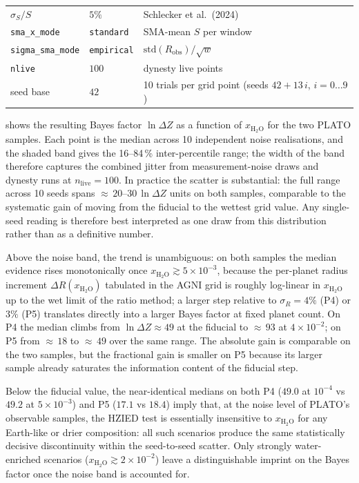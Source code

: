 \begin{table}[H]
\begin{tabular}{lll}
        $\sigma_S / S$             & $5\%$                  & Schlecker et al.\ (2024) \\
        \texttt{sma\_x\_mode}      & \texttt{standard}      & SMA-mean $S$ per window \\
        \texttt{sigma\_sma\_mode}  & \texttt{empirical}     & $\mathrm{std}(R_\mathrm{obs})/\sqrt{w}$ \\
        \texttt{nlive}             & $100$                  & dynesty live points \\
        seed base                  & $42$                   & 10 trials per grid point (seeds $42 + 13\,i$, $i=0\ldots9$) \\
        \bottomrule
    \end{tabular}
\end{table}

 shows the resulting Bayes factor $\ln\Delta Z$
as a function of $x_{\mathrm{H_2O}}$ for the two PLATO samples.  Each point
is the median across 10 independent noise realisations, and the shaded band
gives the 16--84\,\% inter-percentile range; the width of the band therefore
captures the combined jitter from measurement-noise draws and dynesty runs
at $n_\mathrm{live}=100$.  In practice the scatter is substantial: the full
range across 10 seeds spans ${\approx}\,20\text{--}30\,\ln\Delta Z$ units
on both samples, comparable to the systematic gain of moving from the
fiducial to the wettest grid value.  Any single-seed reading is therefore
best interpreted as one draw from this distribution rather than as a
definitive number.

Above the noise band, the trend is unambiguous: on both samples the median
evidence rises monotonically once $x_{\mathrm{H_2O}} \gtrsim 5\times10^{-3}$,
because the per-planet radius increment $\Delta R(x_{\mathrm{H_2O}})$
tabulated in the AGNI grid is roughly log-linear in $x_{\mathrm{H_2O}}$
up to the wet limit of the ratio method; a larger step relative to
$\sigma_R = 4\%$ (P4) or $3\%$ (P5) translates directly into a larger
Bayes factor at fixed planet count.  On P4 the median climbs from
$\ln\Delta Z \approx 49$ at the fiducial to ${\approx}\,93$ at
$4\times10^{-2}$; on P5 from ${\approx}\,18$ to ${\approx}\,49$ over the
same range.  The absolute gain is comparable on the two samples, but the
fractional gain is smaller on P5 because its larger sample already
saturates the information content of the fiducial step.

Below the fiducial value, the near-identical medians on both P4
($49.0$ at $10^{-4}$ vs $49.2$ at $5\times10^{-3}$) and P5 ($17.1$ vs
$18.4$) imply that, at the noise level of PLATO's observable samples,
the HZIED test is essentially insensitive to $x_{\mathrm{H_2O}}$ for any
Earth-like or drier composition: all such scenarios produce the same
statistically decisive discontinuity within the seed-to-seed scatter.
Only strongly water-enriched scenarios
($x_{\mathrm{H_2O}} \gtrsim 2\times10^{-2}$) leave a distinguishable
imprint on the Bayes factor once the noise band is accounted for.

